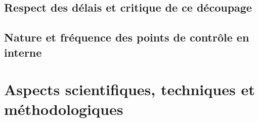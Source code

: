 \documentclass[a4paper, 12pt]{article}
\begin{document}
    
    \newpage{}
    
\subsection{Respect des délais et critique de ce découpage}


    
    \newpage{}
    
\subsection{Nature et fréquence des points de contrôle en interne}


    
    \newpage{}
    


    
\newpage{}
\section{Aspects scientifiques, techniques et méthodologiques}
\end{document}

